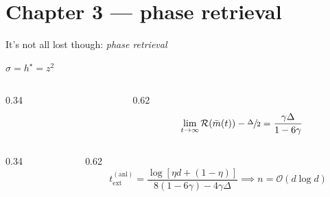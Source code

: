 \documentclass[aspectratio=169,11pt]{beamer}
\begin{document}
\section{Chapter 3 --- phase retrieval}

\begin{frame}{It's not all lost though: \emph{phase retrieval}}
  \vspace{-0.5em}
  \begin{center}
    {\scriptsize\color{black!45}$\sigma = h^\star = z^2$}\quad
  \end{center}
  \vspace{-0.2em}
  \begin{columns}[c]
    \begin{column}{0.34\textwidth}
      \raggedleft
    \end{column}
    \begin{column}{0.62\textwidth}
      \[
        \lim_{t\to\infty} \mathcal{R}(\bar{m}(t)) - \sfrac{\Delta}{2}
          = \frac{\gamma\Delta}{1-6\gamma}
      \]
    \end{column}
  \end{columns}
  \vspace{0.2em}
  \begin{columns}[c]
    \begin{column}{0.34\textwidth}
      \raggedleft
    \end{column}
    \begin{column}{0.62\textwidth}
      \[
        t_{\mathrm{ext}}^{(\mathrm{anl})}
          = \frac{\log\left[\eta d + (1-\eta)\right]}{8(1-6\gamma) - 4\gamma\Delta}
        \implies
        n = \mathcal{O}\left(d \log d\right)
      \]
    \end{column}
  \end{columns}

\end{frame}
\end{document}
